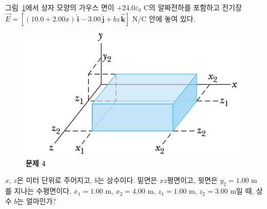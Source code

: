 \documentclass[tightenlines,floatfix,nofootinbib,superscriptaddress,fleqn]{revtex4-2}
\begin{document}
 그림~\ref{fig:3}에서 상자 모양의 가우스
면이 $+24.0\varepsilon_0$ C의 알짜전하를 포함하고 전기장
$\vec{E}=[(10.0 + 2.00x)\,\hat{\bm{i}}-3.00\,\hat{\bm{j}}+
  bz\,\hat{\bm{k}}]$ N/C 안에 놓여 있다. 
\begin{figure}[htp]
  \centering
  \includegraphics[scale=0.6]{qfig3-3.png}
  \caption{\textbf{문제 4}}
  \label{fig:3}
\end{figure}
$x$, $z$은 미터 단위로
  주어지고, $b$는 상수이다. 밑면은 $xz$평면이고, 윗면은 $y_2=1.00$ m를
  지나는 수평면이다. $x_1=1.00$ m, $x_2=4.00$ m, $z_1= 1.00$ m,
  $z_2=3.00$ m일 때, 상수 $b$는 얼마인가? 
\vspace{0.5cm}
\end{document}
